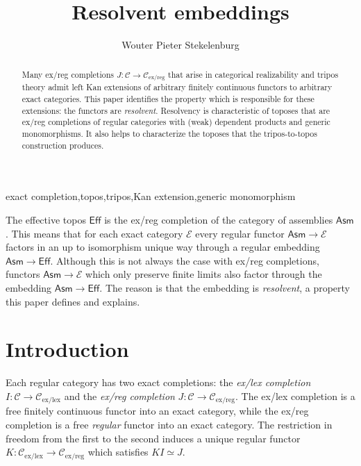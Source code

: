 \documentclass[sort&compress]{elsarticle}
\theoremstyle{plain}
\theoremstyle{definition}
\theoremstyle{remark}
\newcommand\cat\mathcal
\newcommand\exlex{_\mathrm{ex/lex}}\newcommand\exreg{_\mathrm{ex/reg}}
\begin{document}
\begin{frontmatter}
\title{Resolvent embeddings}

\author[W. P. Stekelenburg]{Wouter Pieter Stekelenburg}
\address{Faculty of Mathematics, Informatics and Mechanics,
University of Warsaw,
Banacha 2,
02-097 Warszawa,
Poland}

\begin{abstract}
Many ex/reg completions $J:\cat C\to\cat C\exreg$ that arise in categorical realizability and tripos theory admit left Kan extensions of arbitrary finitely continuous functors to arbitrary exact categories. This paper identifies the property which is responsible for these extensions: the functors are \emph{resolvent}. Resolvency is characteristic of toposes that are ex/reg completions of regular categories with (weak) dependent products and generic monomorphisms. It also helps to characterize the toposes that the tripos-to-topos construction produces.
\end{abstract}

\begin{keyword}
exact completion\sep topos\sep tripos\sep Kan extension\sep generic monomorphism
\end{keyword}


\end{frontmatter}

\newcommand\RT{\mathsf{RT}}
\newcommand\Set{\mathsf{Set}}
\newcommand\pow{\mathbf P}
\newcommand\Eff{\mathsf{Eff}}
\newcommand\Asm{\mathsf{Asm}}

The effective topos $\Eff$ is the ex/reg completion of the category of assemblies $\Asm$. This means that for each exact category $\cat E$ every regular functor $\Asm \to \cat E$ factors in an up to isomorphism unique way through a regular embedding $\Asm\to \Eff$. Although this is not always the case with ex/reg completions, functors $\Asm\to\cat E$ which only preserve finite limits also factor through the embedding $\Asm \to \Eff$. The reason is that the embedding is \emph{resolvent}, a property this paper defines and explains.

\section{Introduction}
Each regular category has two exact completions: the \emph{ex/lex completion} $I:\cat C\to \cat C\exlex$ and the \emph{ex/reg completion} $J:\cat C\to\cat C\exreg$. The ex/lex completion is a free finitely continuous functor into an exact category, while the ex/reg completion is a free \emph{regular} functor into an exact category. The restriction in freedom from the first to the second induces a unique regular functor $K:\cat C\exlex\to\cat C\exreg$ which satisfies $KI\simeq J$.
\end{document}
